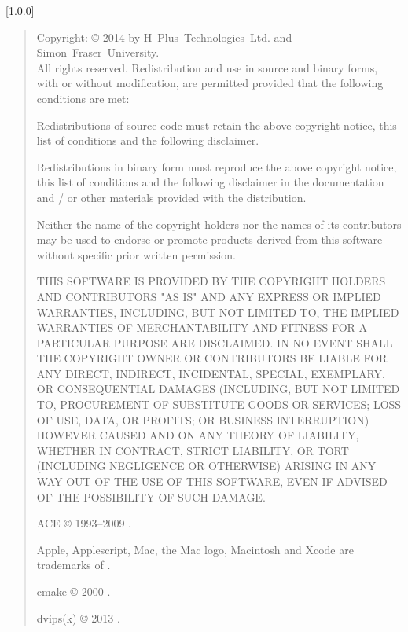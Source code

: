 [1.0.0]
\begin{quote}
\begin{small}
Copyright: \copyright{} 2014 by H~Plus~Technologies~Ltd. and Simon~Fraser~University.
\\
All rights reserved. Redistribution and use in source and binary forms, with or without
modification, are permitted provided that the following conditions are met:
\begin{tightItems}
\item Redistributions of source code must retain the above copyright notice, this list of
conditions and the following disclaimer.
\item Redistributions in binary form must reproduce the above copyright notice, this list
of conditions and the following disclaimer in the documentation and / or other materials
provided with the distribution.
\item Neither the name of the copyright holders nor the names of its contributors may be
used to endorse or promote products derived from this software without specific prior
written permission.
\end{tightItems}
THIS SOFTWARE IS PROVIDED BY THE COPYRIGHT HOLDERS AND CONTRIBUTORS "AS IS" AND ANY
EXPRESS OR IMPLIED WARRANTIES, INCLUDING, BUT NOT LIMITED TO, THE IMPLIED WARRANTIES OF
MERCHANTABILITY AND FITNESS FOR A PARTICULAR PURPOSE ARE DISCLAIMED.
IN NO EVENT SHALL THE COPYRIGHT OWNER OR CONTRIBUTORS BE LIABLE FOR ANY DIRECT, INDIRECT,
INCIDENTAL, SPECIAL, EXEMPLARY, OR CONSEQUENTIAL DAMAGES (INCLUDING, BUT NOT LIMITED TO,
PROCUREMENT OF SUBSTITUTE GOODS OR SERVICES; LOSS OF USE, DATA, OR PROFITS; OR BUSINESS
INTERRUPTION) HOWEVER CAUSED AND ON ANY THEORY OF LIABILITY, WHETHER IN CONTRACT, STRICT
LIABILITY, OR TORT (INCLUDING NEGLIGENCE OR OTHERWISE) ARISING IN ANY WAY OUT OF THE USE
OF THIS SOFTWARE, EVEN IF ADVISED OF THE POSSIBILITY OF SUCH DAMAGE.

ACE \copyright{} 1993--2009
.

Apple, Applescript, Mac, the Mac logo, Macintosh and Xcode are trademarks of
.

cmake \copyright{} 2000
.

dvips(k) \copyright{} 2013
.


\end{small}
\end{quote}
